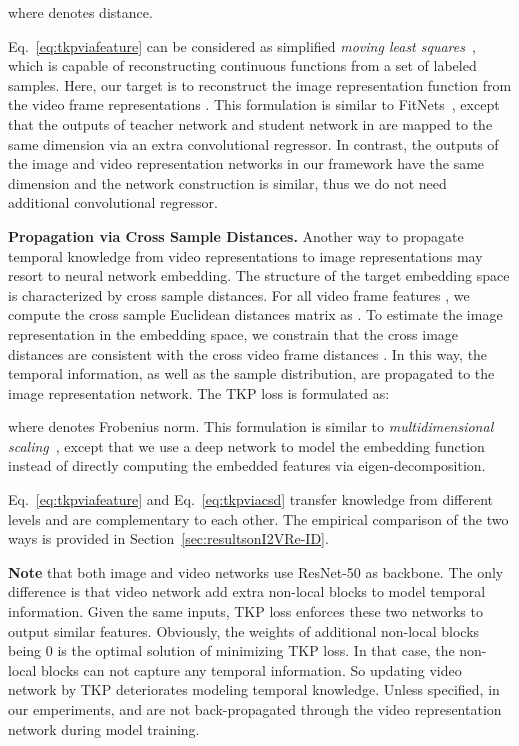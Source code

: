 \documentclass[10pt,twocolumn,letterpaper]{article}
\begin{document}
where  denotes  distance.

Eq.~\eqref{eq:tkpviafeature} can be considered as simplified \emph{moving least squares}~\cite{Levin1998The,Schaefer2006Image}, which is capable of reconstructing continuous functions from a set of labeled samples. Here, our target is to reconstruct the image representation function  from the video frame representations .
This formulation is similar to FitNets~\cite{Romero2015FitNets}, except that the outputs of teacher network and student network in \cite{Romero2015FitNets} are mapped to the same dimension via an extra convolutional regressor.
In contrast, the outputs of the image and video representation networks in our framework have the same dimension and the network construction is similar, thus we do not need additional convolutional regressor.

\vspace{5pt}
\noindent
{\bf Propagation via Cross Sample Distances.} 
Another way to propagate temporal knowledge from video representations to image representations may resort to neural network embedding.
The structure of the target embedding space is characterized by cross sample distances.
For all video frame features , we compute the cross sample Euclidean distances matrix as . To estimate the image representation in the embedding space, we constrain that the cross image distances  are consistent with the cross video frame distances  . In this way, the temporal information, as well as the sample distribution, are propagated to the image representation network. The TKP loss is formulated as:

where  denotes Frobenius norm.
This formulation is similar to \emph{multidimensional scaling}~\cite{Kruskal1964Multidimensional}, except that we use a deep network to model the embedding function  instead of directly computing the embedded features via eigen-decomposition.

Eq.~\eqref{eq:tkpviafeature} and Eq.~\eqref{eq:tkpviacsd} transfer knowledge from different levels and are complementary to each other.
The empirical comparison of the two ways is provided in Section~\ref{sec:resultsonI2VRe-ID}.

{\bf Note} that both image and video networks use ResNet-50 as backbone.
The only difference is that video network add extra non-local blocks to model temporal information.
Given the same inputs, TKP loss enforces these two networks to output similar features.
Obviously, the weights of additional non-local blocks being 0 is the optimal solution of minimizing TKP loss.
In that case, the non-local blocks can not capture any temporal information.
So updating video network by TKP deteriorates modeling temporal knowledge.
Unless specified, in our emperiments,  and  are not back-propagated through the video representation network during model training.
\end{document}
